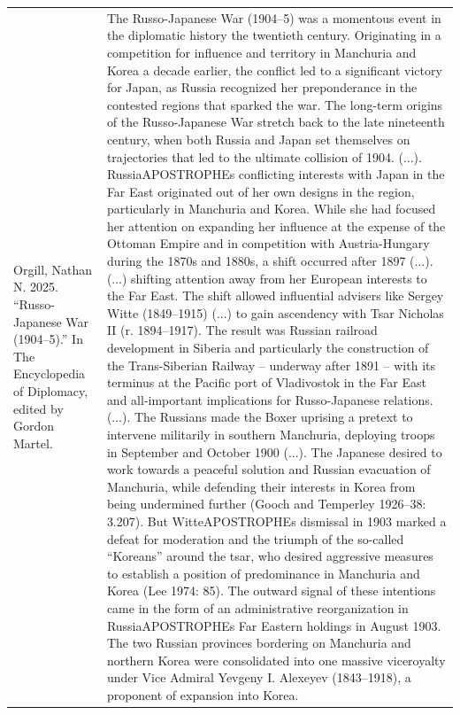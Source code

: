{\begin{longtable}{p{}p{}}
Orgill, Nathan N. 2025. “Russo-Japanese War (1904–5).” In The Encyclopedia of Diplomacy, edited by Gordon Martel. & The Russo-Japanese War (1904–5) was a momentous event in the diplomatic history the twentieth century. Originating in a competition for influence and territory in Manchuria and Korea a decade earlier, the conflict led to a significant victory for Japan, as Russia recognized her preponderance in the contested regions that sparked the war. The long-term origins of the Russo-Japanese War stretch back to the late nineteenth century, when both Russia and Japan set themselves on trajectories that led to the ultimate collision of 1904. (...). RussiaAPOSTROPHEs conflicting interests with Japan in the Far East originated out of her own designs in the region, particularly in Manchuria and Korea. While she had focused her attention on expanding her influence at the expense of the Ottoman Empire and in competition with Austria-Hungary during the 1870s and 1880s, a shift occurred after 1897 (...). (...) shifting attention away from her European interests to the Far East. The shift allowed influential advisers like Sergey Witte (1849–1915) (...) to gain ascendency with Tsar Nicholas II (r. 1894–1917). The result was Russian railroad development in Siberia and particularly the construction of the Trans-Siberian Railway – underway after 1891 – with its terminus at the Pacific port of Vladivostok in the Far East and all-important implications for Russo-Japanese relations. (...). The Russians made the Boxer uprising a pretext to intervene militarily in southern Manchuria, deploying troops in September and October 1900 (...). The Japanese desired to work towards a peaceful solution and Russian evacuation of Manchuria, while defending their interests in Korea from being undermined further (Gooch and Temperley 1926–38: 3.207). But WitteAPOSTROPHEs dismissal in 1903 marked a defeat for moderation and the triumph of the so-called “Koreans” around the tsar, who desired aggressive measures to establish a position of predominance in Manchuria and Korea (Lee 1974: 85). The outward signal of these intentions came in the form of an administrative reorganization in RussiaAPOSTROPHEs Far Eastern holdings in August 1903. The two Russian provinces bordering on Manchuria and northern Korea were consolidated into one massive viceroyalty under Vice Admiral Yevgeny I. Alexeyev (1843–1918), a proponent of expansion into Korea.



\end{longtable}}

